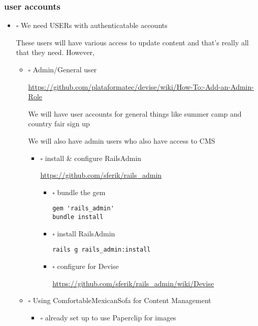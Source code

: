 \documentclass[11pt]{article}
\begin{document}
\subsubsection*{user accounts}
\label{sec-1-2-2}

\begin{itemize}
\item $\square$ We need USERs with authenticatable accounts

These users will have various access to update content and that's really
all that they need. However,

\begin{itemize}
\item $\square$ Admin/General user

\url{https://github.com/plataformatec/devise/wiki/How-To:-Add-an-Admin-Role}

We will have user accounts for general things like summer camp and 
country fair sign up

We will also have admin users who also have access to CMS

\begin{itemize}
\item $\square$ install \& configure RailsAdmin

\url{https://github.com/sferik/rails_admin}

\begin{itemize}
\item $\square$ bundle the gem

\begin{verbatim}
gem 'rails_admin'
bundle install
\end{verbatim}

\item $\square$ install RailsAdmin

\begin{verbatim}
rails g rails_admin:install
\end{verbatim}

\item $\square$ configure for Devise

\url{https://github.com/sferik/rails_admin/wiki/Devise}
\end{itemize}
\end{itemize}

\item $\square$ Using ComfortableMexicanSofa for Content Management

\begin{itemize}
\item $\square$ already set up to use Paperclip for images


\end{itemize}
\end{itemize}
\end{itemize}
\end{document}
